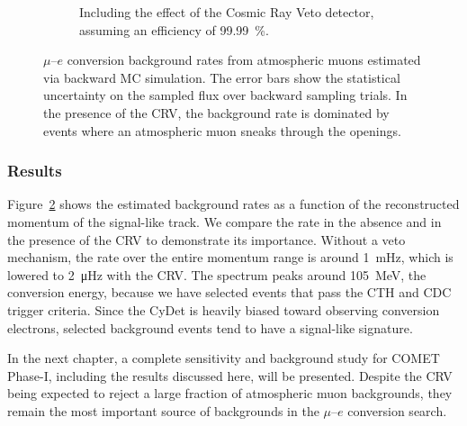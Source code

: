 \begin{figure}[t]
\begin{subfigure}[t]{0.48\textwidth}
        \caption{Including the effect of the Cosmic Ray Veto detector, assuming
        an efficiency of \SI{99.99}{\percent}.}
        \label{fig:bmc_rate_vs_momentum_crv}
    \end{subfigure}
    \caption{ 
        $\mu$--$e$ conversion background rates from atmospheric muons
        estimated via backward MC simulation. The error bars show the
        statistical uncertainty on the sampled flux over backward sampling
        trials. In the presence of the CRV, the background rate is dominated by
        events where an atmospheric muon sneaks through the openings. }
        \label{fig:bmc_rate_vs_momentum}
\end{figure}

\subsubsection{Results}
Figure~\ref{fig:bmc_rate_vs_momentum} shows the estimated background rates as a
function of the reconstructed momentum of the signal-like track. We compare the
rate in the absence and in the presence of the CRV to demonstrate its
importance. Without a veto mechanism, the rate over the entire momentum range is
around \SI{1}{\mHz}, which is lowered to \SI{2}{\micro\hertz} with the CRV. The
spectrum peaks around \SI{105}{\MeV}, the conversion energy, because we have
selected events that pass the CTH and CDC trigger criteria. Since the CyDet is
heavily biased toward observing conversion electrons, selected background events
tend to have a signal-like signature.

In the next chapter, a complete sensitivity and background study for COMET
Phase\nobreakdash-I, including the results discussed here, will be presented. Despite the
CRV being expected to reject a large fraction of atmospheric muon backgrounds,
they remain the most important source of backgrounds in the $\mu$--$e$
conversion search. 